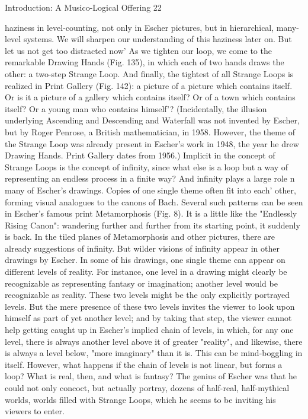 Introduction: A Musico-Logical Offering   22

haziness in level-counting, not only in Escher pictures, but in hierarchical, many-level
systems. We will sharpen our understanding of this haziness later on. But let us not get
too distracted now' As we tighten our loop, we come to the remarkable Drawing Hands
(Fig. 135), in which each of two hands draws the other: a two-step Strange Loop. And
finally, the tightest of all Strange Loops is realized in Print Gallery (Fig. 142): a picture
of a picture which contains itself. Or is it a picture of a gallery which contains itself? Or
of a town which contains itself? Or a young man who contains himself'? (Incidentally, the
illusion underlying Ascending and Descending and Waterfall was not invented by Escher,
but by Roger Penrose, a British mathematician, in 1958. However, the theme of the
Strange Loop was already present in Escher's work in 1948, the year he drew Drawing
Hands. Print Gallery dates from 1956.)
   Implicit in the concept of Strange Loops is the concept of infinity, since what else is a
loop but a way of representing an endless process in a finite way? And infinity plays a
large role n many of Escher's drawings. Copies of one single theme often fit into each'
other, forming visual analogues to the canons of Bach. Several such patterns can be seen
in Escher's famous print Metamorphosis (Fig. 8). It is a little like the "Endlessly Rising
Canon": wandering further and further from its starting point, it suddenly is back. In the
tiled planes of Metamorphosis and other pictures, there are already suggestions of
infinity. But wilder visions of infinity appear in other drawings by Escher. In some of his
drawings, one single theme can appear on different levels of reality. For instance, one
level in a drawing might clearly be recognizable as representing fantasy or imagination;
another level would be recognizable as reality. These two levels might be the only
explicitly portrayed levels. But the mere presence of these two levels invites the viewer to
look upon himself as part of yet another level; and by taking that step, the viewer cannot
help getting caught up in Escher's implied chain of levels, in which, for any one level,
there is always another level above it of greater "reality", and likewise, there is always a
level below, "more imaginary" than it is. This can be mind-boggling in itself. However,
what happens if the chain of levels is not linear, but forms a loop? What is real, then, and
what is fantasy? The genius of Escher was that he could not only concoct, but actually
portray, dozens of half-real, half-mythical worlds, worlds filled with Strange Loops,
which he seems to be inviting his viewers to enter.

